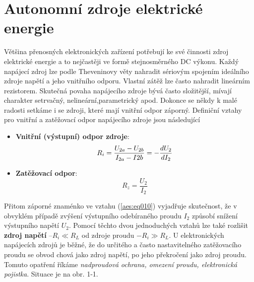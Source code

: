 {
\chapter{Autonomní zdroje elektrické energie}
\minitoc
  Většina přenosných elektronických zařízení potřebují ke své činnosti zdroj elektrické energie a 
  to nejčastěji ve formě stejnosměrného DC výkonu. Každý napájecí zdroj lze podle Theveninovy věty 
  nahradit sériovým spojením ideálního zdroje napětí a jeho vnitřního odporu. Vlastní zátěž lze 
  často nahradit lineárním rezistorem. Skutečná povaha napájecího zdroje bývá často složitější, 
  mívají charakter setrvačný, nelineární,pa\-ra\-me\-tri\-cký apod. Dokonce se někdy k malé radosti 
  setkáme 
  i se zdroji, které mají vnitřní odpor záporný. Definiční vztahy pro vnitřní a zatěžovací odpor 
  napájecího zdroje jsou následující
  \begin{itemize}
    \item \textbf{Vnitřní (výstupní) odpor zdroje}:
          \begin{equation}\label{aes:eq010}
            R_i = \frac{U_{2a}-U_{2b}}{I_{2a} - I{2b}} = -\dfrac{d U_2}{d I_2}
          \end{equation}
    \item \textbf{Zatěžovací odpor}:
          \begin{equation}\label{aes:eq011}
            R_z = \frac{U_2}{I_2}
          \end{equation}
  \end{itemize}
  Přitom záporné znaménko ve vztahu (\ref{aes:eq010}) vyjadřuje skutečnost, že v obvyklém případě 
  zvýšení výstupního odebíraného proudu \(I_2\) způsobí snížení výstupního napětí \(U_2\). Pomocí 
  těchto dvou jednoduchých vztahů lze také rozlišit \textbf{zdroj napětí} \(– R_i \ll R_L\) od 
  zdroje proudu \(- R_i\gg R_L\). U elektronických napájecích zdrojů je běžné, že do určitého a 
  často nastavitelného zatěžovacího proudu se obvod chová jako zdroj napětí, po jeho překročení 
  jako zdroj proudu. Tomuto opatření říkáme \emph{nadproudová ochrana, omezení proudu, elektronická 
  pojistka}. Situace je na obr. 1-1.
  
}
